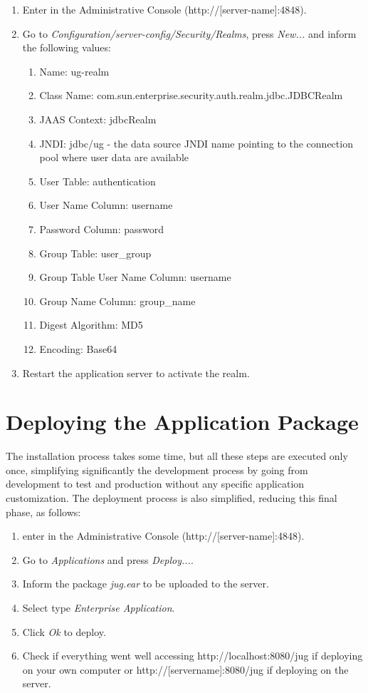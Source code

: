 \documentclass[envcountsame,envcountchap]{svmono}
\begin{document}
\begin{enumerate}
\item Enter in the Administrative Console (http://[server-name]:4848).
\item Go to \textit{Configuration/server-config/Security/Realms}, press \textit{New...} and inform the following values:
   \begin{enumerate}
   \item Name: ug-realm
   \item Class Name: com.sun.enterprise.security.auth.realm.jdbc.JDBCRealm
   \item JAAS Context: jdbcRealm
   \item JNDI: jdbc/ug - the data source JNDI name pointing to the connection pool where user data are available
   \item User Table: authentication
   \item User Name Column: username
   \item Password Column: password
   \item Group Table: user\_group
   \item Group Table User Name Column: username
   \item Group Name Column: group\_name
   \item Digest Algorithm: MD5
   \item Encoding: Base64
   \end{enumerate}
\item Restart the application server to activate the realm.
\end{enumerate}

\section{Deploying the Application Package}

The installation process takes some time, but all these steps are executed only once, simplifying significantly the development process by going from development to test and production without any specific application customization. The deployment process is also simplified, reducing this final phase, as follows:

\begin{enumerate}
\item enter in the Administrative Console (http://[server-name]:4848).
\item Go to \textit{Applications} and press \textit{Deploy...}.
\item Inform the package \textit{jug.ear} to be uploaded to the server.
\item Select type \textit{Enterprise Application}.
\item Click \textit{Ok} to deploy.
\item Check if everything went well accessing http://localhost:8080/jug if deploying on your own computer or http://[servername]:8080/jug if deploying on the server.
\end{enumerate}
\end{document}
